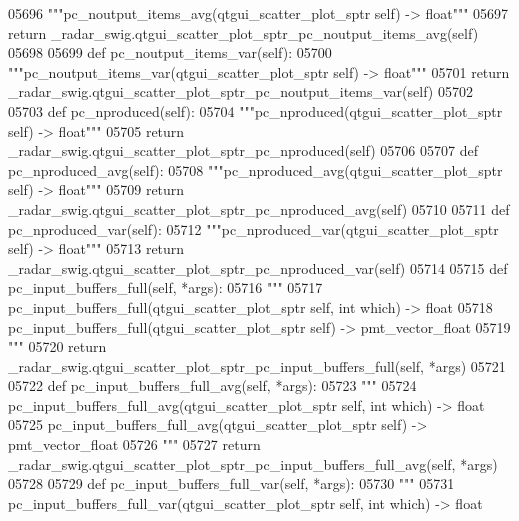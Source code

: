\begin{DoxyCode}
{{{{{{{{{{{{{{{{{{{05696         \textcolor{stringliteral}{"""pc\_noutput\_items\_avg(qtgui\_scatter\_plot\_sptr self) -> float"""}
05697         \textcolor{keywordflow}{return} \_radar\_swig.qtgui\_scatter\_plot\_sptr\_pc\_noutput\_items\_avg(self)
05698 
05699     \textcolor{keyword}{def }pc_noutput_items_var(self):
05700         \textcolor{stringliteral}{"""pc\_noutput\_items\_var(qtgui\_scatter\_plot\_sptr self) -> float"""}
05701         \textcolor{keywordflow}{return} \_radar\_swig.qtgui\_scatter\_plot\_sptr\_pc\_noutput\_items\_var(self)
05702 
05703     \textcolor{keyword}{def }pc_nproduced(self):
05704         \textcolor{stringliteral}{"""pc\_nproduced(qtgui\_scatter\_plot\_sptr self) -> float"""}
05705         \textcolor{keywordflow}{return} \_radar\_swig.qtgui\_scatter\_plot\_sptr\_pc\_nproduced(self)
05706 
05707     \textcolor{keyword}{def }pc_nproduced_avg(self):
05708         \textcolor{stringliteral}{"""pc\_nproduced\_avg(qtgui\_scatter\_plot\_sptr self) -> float"""}
05709         \textcolor{keywordflow}{return} \_radar\_swig.qtgui\_scatter\_plot\_sptr\_pc\_nproduced\_avg(self)
05710 
05711     \textcolor{keyword}{def }pc_nproduced_var(self):
05712         \textcolor{stringliteral}{"""pc\_nproduced\_var(qtgui\_scatter\_plot\_sptr self) -> float"""}
05713         \textcolor{keywordflow}{return} \_radar\_swig.qtgui\_scatter\_plot\_sptr\_pc\_nproduced\_var(self)
05714 
05715     \textcolor{keyword}{def }pc_input_buffers_full(self, *args):
05716         \textcolor{stringliteral}{"""}
05717 \textcolor{stringliteral}{        pc\_input\_buffers\_full(qtgui\_scatter\_plot\_sptr self, int which) -> float}
05718 \textcolor{stringliteral}{        pc\_input\_buffers\_full(qtgui\_scatter\_plot\_sptr self) -> pmt\_vector\_float}
05719 \textcolor{stringliteral}{        """}
05720         \textcolor{keywordflow}{return} \_radar\_swig.qtgui\_scatter\_plot\_sptr\_pc\_input\_buffers\_full(self, *args)
05721 
05722     \textcolor{keyword}{def }pc_input_buffers_full_avg(self, *args):
05723         \textcolor{stringliteral}{"""}
05724 \textcolor{stringliteral}{        pc\_input\_buffers\_full\_avg(qtgui\_scatter\_plot\_sptr self, int which) -> float}
05725 \textcolor{stringliteral}{        pc\_input\_buffers\_full\_avg(qtgui\_scatter\_plot\_sptr self) -> pmt\_vector\_float}
05726 \textcolor{stringliteral}{        """}
05727         \textcolor{keywordflow}{return} \_radar\_swig.qtgui\_scatter\_plot\_sptr\_pc\_input\_buffers\_full\_avg(self, *args)
05728 
05729     \textcolor{keyword}{def }pc_input_buffers_full_var(self, *args):
05730         \textcolor{stringliteral}{"""}
05731 \textcolor{stringliteral}{        pc\_input\_buffers\_full\_var(qtgui\_scatter\_plot\_sptr self, int which) -> float}
}}}}}}}}}}}}}}}}}}}
\end{DoxyCode}
